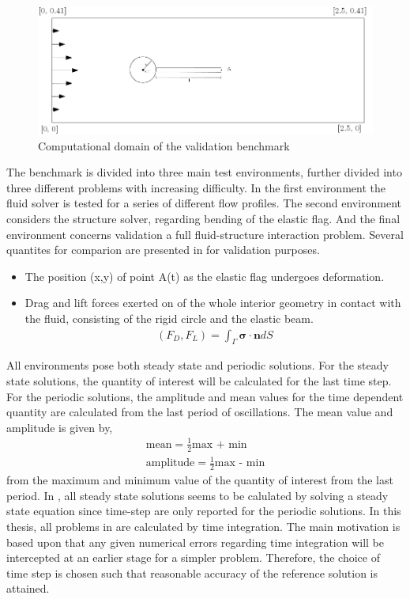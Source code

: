 \begin{figure}[h!]
  \centering
    \includegraphics[scale=0.2]{./Fig/turekflag.png}
      \caption{Computational domain of the validation benchmark}
\end{figure}

The benchmark is divided into three main test environments, further divided into three different problems with increasing difficulty. In the first environment the fluid solver is tested for a series of different flow profiles. The second environment considers the structure solver, regarding bending of the elastic flag. And the final environment concerns validation a full fluid-structure interaction problem.  Several quantites for comparion are presented in \cite{Hron2006} for validation purposes. 

\begin{itemize}
\item The position (x,y) of point A(t) as the elastic flag undergoes deformation.
\item Drag and lift forces exerted on of the whole interior geometry in contact with the fluid, consisting of the rigid circle and the elastic beam.
\begin{align*}
(F_D, F_L) = \int_{\Gamma} \mathbf{\sigma} \cdot \mathbf{n} dS
\end{align*}
\end{itemize}

\newpage
All environments pose both steady state and periodic solutions. For the steady state solutions, the quantity of interest will be calculated for the last time step. For the periodic solutions, the amplitude and mean values for the time dependent quantity are calculated from the last period of oscillations. The mean value and amplitude is given by,
\begin{align*}
\text{mean} = \frac{1}{2} \text{max + min} \\
\text{amplitude} = \frac{1}{2} \text{max - min}
\end{align*}
from the maximum and minimum value of the quantity of interest from the last period. In \cite{Hron2006}, all steady state solutions seems to be calulated by solving a steady state equation since time-step are only reported for the periodic solutions. In this thesis, all problems in \cite{Hron2006} are calculated by time integration. The main motivation is based upon that any given numerical errors regarding time integration will be intercepted at an earlier stage for a simpler problem. Therefore, the choice of time step  is chosen such that reasonable accuracy of the reference solution is attained.

